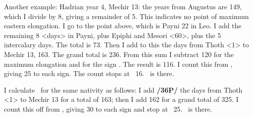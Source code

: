 Another example: Hadrian year 4, Mechir 13: the years from Augustus are 149, which I divide by 8, giving a remainder of 5. This indicates no point of maximum eastern elongation. I go to the point above, which is Payni 22 in Leo. I add the remaining 8 <days> in Payni, plus Epiphi and Mesori <60>, plus the
5 intercalary days. The total is 73. Then I add to this the days from Thoth <1> to Mechir 13, 163. The grand total is 236. From this sum I subtract 120 for the maximum elongation and for the sign \Leo. The result is 116. I count this from \Virgo, giving 25 to each sign. The count stops at \Capricorn\, 16\deg. \Venus\, is there.

I calculate \Mercury\, for the same nativity as follows: I add \textbf{/36P/} the days from Thoth <1> to Mechir 13 for a total of 163; then I add 162 for a grand total of 325. I count this off from \Aries, giving 30 to each sign and stop at \Aquarius\, 25\deg. \Mercury\, is there.

\newpage